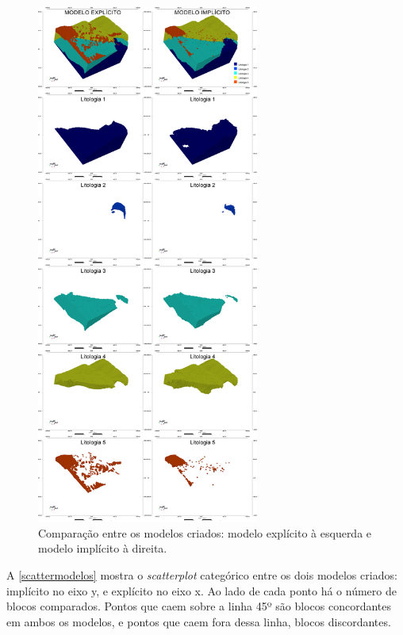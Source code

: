 \begin{figure}[H]
	\caption{\label{modelo3d}Comparação entre os modelos criados: modelo explícito à esquerda e modelo implícito à direita.}
	\begin{center}
		\includegraphics[width=0.65\textwidth]{estudo_de_caso/modelo3d}
	\end{center}
\end{figure}

A \autoref{scattermodelos} mostra o \textit{scatterplot} categórico entre os dois modelos criados: implícito no eixo y, e explícito no eixo x. Ao lado de cada ponto há o número de blocos comparados. Pontos que caem sobre a linha 45º são blocos concordantes em ambos os modelos, e pontos que caem fora dessa linha, blocos discordantes.

